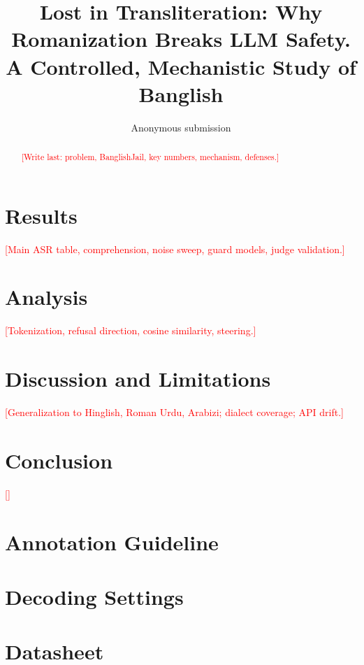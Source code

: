 \documentclass[11pt]{article}
\title{Lost in Transliteration: Why Romanization Breaks LLM Safety.\\A Controlled, Mechanistic Study of Banglish}
\author{Anonymous submission}
\newcommand{\todo}[1]{\textcolor{red}{[#1]}}  %
\begin{document}
\maketitle

\begin{abstract}
\todo{Write last: problem, BanglishJail, key numbers, mechanism, defenses.}
\end{abstract}


\section{Results}
\todo{Main ASR table, comprehension, noise sweep, guard models, judge validation.}

\section{Analysis}
\todo{Tokenization, refusal direction, cosine similarity, steering.}

\section{Discussion and Limitations}
\todo{Generalization to Hinglish, Roman Urdu, Arabizi; dialect coverage; API drift.}

\section{Conclusion}
\todo{}



\appendix
\section{Annotation Guideline}
\section{Decoding Settings}
\section{Datasheet}
\end{document}
